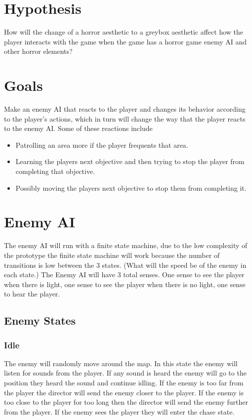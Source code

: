 \documentclass{article}
\begin{document}
\section*{Hypothesis}
How will the change of a horror aesthetic to a greybox aesthetic affect how the player 
interacts with the game when the game has a horror game enemy AI and other horror elements? 


\section*{Goals}
Make an enemy AI that reacts to the player and changes
its behavior according to the player's actions, which in turn
will change the way that the player reacts to the enemy AI.
Some of these reactions include
\begin{itemize}
    \item Patrolling an area more if the player frequents that area. 
    \item Learning the players next objective and then trying to stop
    the player from completing that objective.
    \item Possibly moving the players next objective to stop them from
    completing it.
\end{itemize}






\section*{Enemy AI}
The enemy AI will run with a finite state machine, due to the low complexity
of the prototype the finite state machine will work because the number of 
transitions is low between the 3 states.
(What will the speed be of the enemy in each state.)
The Enemy AI will have 3 total senses. One sense to see the player when there
is light, one sense to see the player when there is no light, one sense
to hear the player.
\subsection*{Enemy States}
\subsubsection*{Idle}
The enemy will randomly move around the map.
In this state the enemy will listen for sounds from the player. If any
sound is heard the enemy will go to the position they heard the sound 
and continue idling.
If the enemy is too far from the player the director will send the enemy
closer to the player.
If the enemy is too close to the player for too long then the director
will send the enemy further from the player.
If the enemy sees the player they will enter the chase state.
\end{document}
